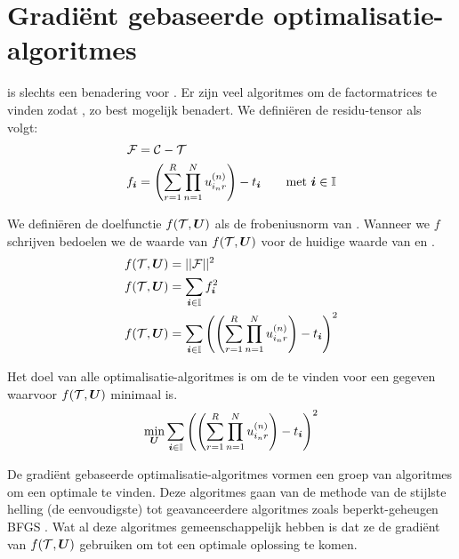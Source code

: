 
\section{Gradi\"ent gebaseerde optimalisatie-algoritmes}
\label{h:algo} 

\TT{} is slechts een benadering voor \CC{}. Er zijn veel algoritmes om de factormatrices te vinden zodat \CC{}, \TT{} zo best mogelijk benadert. We defini\"eren de residu-tensor \FF{} als volgt:
\begin{align*}
    \mathcal{F} &= \mathcal{C} - \mathcal{T}\\
    f_{\boldsymbol{i}{}} &= \left( \sum_{r=1}^{R} \prod_{n=1}^{N} u^{(n)}_{i_{n}r} \right) - t_{\boldsymbol{i}{}} \qquad \text{met $\boldsymbol{i}{} \in \mathbb{I}$}\\
\end{align*}

We defini\"eren de doelfunctie $f(\mathcal{T}, \boldsymbol{U})$ als de frobeniusnorm van \FF{}. Wanneer we $f$ schrijven bedoelen we %
de waarde van $f(\mathcal{T}, \boldsymbol{U})$ voor de huidige waarde van \TT{} en \UUU{}.
\begin{align*}
    f(\mathcal{T}, \boldsymbol{U}) &= ||\mathcal{F}||^2\\
    f(\mathcal{T}, \boldsymbol{U}) &= \sum_{\boldsymbol{i}{} \in \mathbb{I}} f_{\boldsymbol{i}{}}^2\\
    f(\mathcal{T}, \boldsymbol{U}) &=  \sum_{\boldsymbol{i}{} \in \mathbb{I}} \left( \left( \sum_{r=1}^{R} \prod_{n=1}^{N} u^{(n)}_{i_{n}r} \right) - t_{\boldsymbol{i}{}} \right)^2
\end{align*}

Het doel van alle optimalisatie-algoritmes is om de \UUU{} te vinden voor een gegeven \TT{} waarvoor $f(\mathcal{T}, \boldsymbol{U})$ minimaal is.
\[
    \min_{\boldsymbol{U}} \sum_{\boldsymbol{i}{} \in \mathbb{I}} \left( \left( \sum_{r=1}^{R} \prod_{n=1}^{N} u^{(n)}_{i_{n}r} \right) - t_{\boldsymbol{i}{}} \right)^2
\]

De gradi\"ent gebaseerde optimalisatie-algoritmes vormen een groep van algoritmes om een optimale \UUU{} te vinden. Deze algoritmes gaan van de methode van de stijlste helling (de eenvoudigste) tot geavanceerdere algoritmes zoals beperkt-geheugen BFGS \cite{bfgs}. Wat al deze algoritmes gemeenschappelijk hebben is dat ze de gradi\"ent van $f(\mathcal{T}, \boldsymbol{U})$ gebruiken om tot een optimale oplossing te komen.

